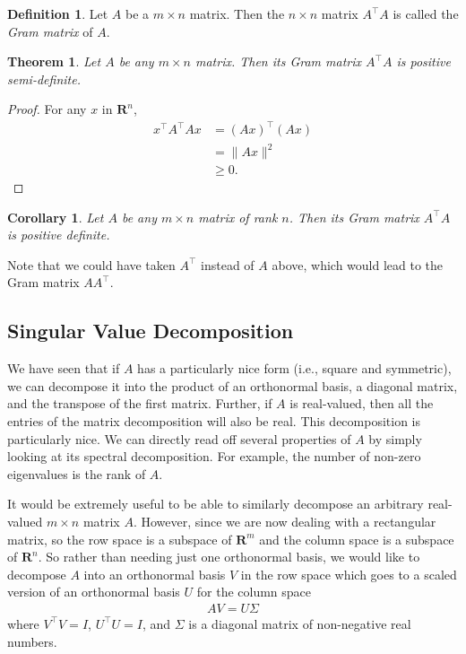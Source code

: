 \documentclass[]{article}
\theoremstyle{plain}
\newtheorem{thm}{Theorem}
\newtheorem*{cor}{Corollary}
\theoremstyle{definition}
\newtheorem{defn}{Definition}
\theoremstyle{remark}
\newcommand{\reals}{\mathbf{R}}
\begin{document}
\begin{defn}
Let $A$ be a $m \times n$ matrix.  Then the $n \times n$ matrix $A^\top A$
is called the \emph{Gram matrix} of $A$.
\end{defn}

\begin{thm}
Let $A$ be any $m \times n$ matrix.  Then its Gram matrix $A^\top A$ is
positive semi-definite.
\end{thm}
\begin{proof}
For any $x$ in $\reals^n$,
\begin{align*}
x^\top A^\top Ax &= (Ax)^\top(Ax) \\
  &= \|Ax\|^2 \\
  &\ge 0.
\end{align*} 
\end{proof}

\begin{cor}
Let $A$ be any $m \times n$ matrix of rank $n$.  Then its Gram matrix
$A^\top A$ is positive definite.
\end{cor}

Note that we could have taken $A^\top$ instead of $A$ above, which would
lead to the Gram matrix $AA^\top$.



\subsection{Singular Value Decomposition}\label{svd}

We have seen that if $A$ has a particularly nice form (i.e., square
and symmetric), we can decompose it into the product of an
orthonormal basis, a diagonal matrix, and the transpose of the
first matrix.  Further, if $A$ is real-valued, then all the entries
of the matrix decomposition will also be real.  This decomposition
is particularly nice.  We can directly read off several properties
of $A$ by simply looking at its spectral decomposition.  For example,
the number of non-zero eigenvalues is the rank of $A$.

It would be extremely useful to be able to similarly decompose an arbitrary
real-valued $m \times n$ matrix $A$.  However, since we are now dealing with
a rectangular matrix, so the row space is a subspace of $\reals^m$ and
the column space is a subspace of $\reals^n$.  So rather than needing
just one orthonormal basis, we would like to decompose $A$ into an
orthonormal basis $V$ in the row space which goes to a scaled version
of an orthonormal basis $U$ for the column space
\begin{align*}
AV = U\Sigma
\end{align*}
where $V^\top V = I$, $U^\top U = I$, and $\Sigma$ is a diagonal matrix
of non-negative real numbers.
\end{document}
